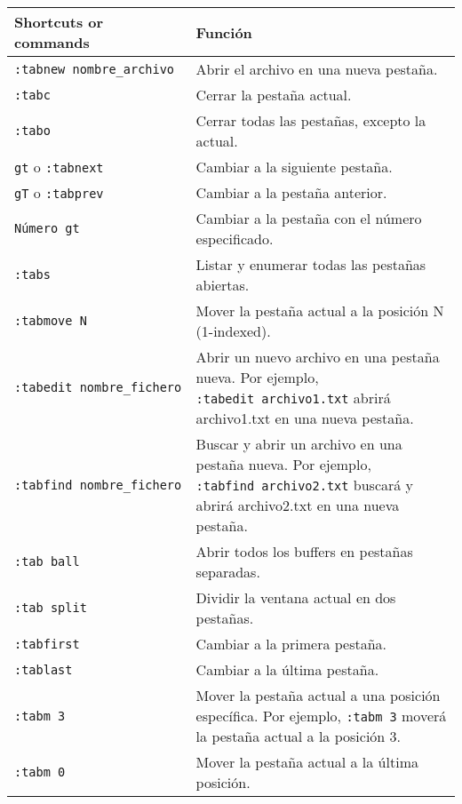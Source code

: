 \documentclass[
  doc,
  floatsintext,
  longtable,
  a4paper,
  nolmodern,
  notxfonts,
  notimes,
  colorlinks=true,linkcolor=blue,citecolor=blue,urlcolor=blue]{apa7}
\begin{document}
\begin{longtable}[]{@{}
  >{\raggedright\arraybackslash}p{}
  >{\raggedright\arraybackslash}p{}@{}}
\toprule\noalign{}
\begin{minipage}[b]{\linewidth}\raggedright
Shortcuts or commands
\end{minipage} & \begin{minipage}[b]{\linewidth}\raggedright
Función
\end{minipage} \\
\midrule\noalign{}
\endhead
\bottomrule\noalign{}
\endlastfoot
\texttt{:tabnew\ nombre\_archivo} & Abrir el archivo en una nueva
pestaña. \\
\texttt{:tabc} & Cerrar la pestaña actual. \\
\texttt{:tabo} & Cerrar todas las pestañas, excepto la actual. \\
\texttt{gt} o \texttt{:tabnext} & Cambiar a la siguiente pestaña. \\
\texttt{gT} o \texttt{:tabprev} & Cambiar a la pestaña anterior. \\
\texttt{Número\ gt} & Cambiar a la pestaña con el número
especificado. \\
\texttt{:tabs} & Listar y enumerar todas las pestañas abiertas. \\
\texttt{:tabmove\ N} & Mover la pestaña actual a la posición N
(1-indexed). \\
\texttt{:tabedit\ nombre\_fichero} & Abrir un nuevo archivo en una
pestaña nueva. Por ejemplo, \texttt{:tabedit\ archivo1.txt} abrirá
archivo1.txt en una nueva pestaña. \\
\texttt{:tabfind\ nombre\_fichero} & Buscar y abrir un archivo en una
pestaña nueva. Por ejemplo, \texttt{:tabfind\ archivo2.txt} buscará y
abrirá archivo2.txt en una nueva pestaña. \\
\texttt{:tab\ ball} & Abrir todos los buffers en pestañas separadas. \\
\texttt{:tab\ split} & Dividir la ventana actual en dos pestañas. \\
\texttt{:tabfirst} & Cambiar a la primera pestaña. \\
\texttt{:tablast} & Cambiar a la última pestaña. \\
\texttt{:tabm\ 3} & Mover la pestaña actual a una posición específica.
Por ejemplo, \texttt{:tabm\ 3} moverá la pestaña actual a la posición
3. \\
\texttt{:tabm\ 0} & Mover la pestaña actual a la última posición. \\

\end{longtable}
\end{document}
